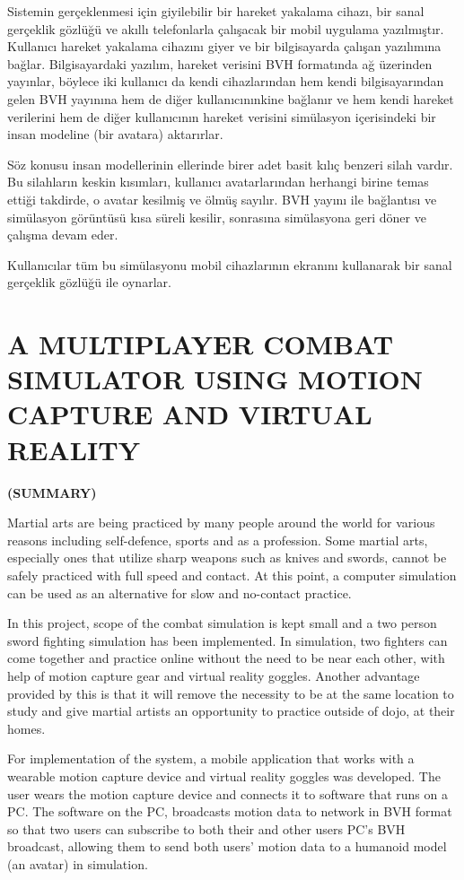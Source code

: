 \documentclass[a4paper, 12pt, titlepage]{article}
\newcommand{\thetitle}{A MULTIPLAYER COMBAT SIMULATOR USING MOTION CAPTURE AND VIRTUAL REALITY}
\begin{document}
Sistemin gerçeklenmesi için giyilebilir bir hareket yakalama cihazı, bir sanal gerçeklik
gözlüğü ve akıllı telefonlarla çalışacak bir mobil uygulama yazılmıştır. Kullanıcı
hareket yakalama cihazını giyer ve bir bilgisayarda çalışan yazılımına bağlar.
Bilgisayardaki yazılım, hareket verisini BVH formatında ağ üzerinden yayınlar, böylece iki kullanıcı da kendi
cihazlarından hem kendi bilgisayarından gelen BVH yayınına hem de diğer kullanıcınınkine
bağlanır ve hem kendi hareket verilerini hem de diğer kullanıcının hareket verisini simülasyon
içerisindeki bir insan modeline (bir avatara) aktarırlar.

Söz konusu insan modellerinin ellerinde birer adet basit kılıç benzeri silah vardır. Bu silahların
keskin kısımları, kullanıcı avatarlarından herhangi birine temas ettiği takdirde, o avatar kesilmiş
ve ölmüş sayılır. BVH yayını ile bağlantısı ve simülasyon görüntüsü kısa süreli kesilir, sonrasına
simülasyona geri döner ve çalışma devam eder.

Kullanıcılar tüm bu simülasyonu mobil cihazlarının ekranını kullanarak bir sanal gerçeklik gözlüğü ile
oynarlar.

\newpage
\section*{\centering\thetitle}
\centerline{\fontsize{16pt}{21.6pt}\sffamily\bfseries (SUMMARY)}
Martial arts are being practiced by many people around the world for various reasons including
self-defence, sports and as a profession. Some martial arts, especially ones that utilize sharp
weapons such as knives and swords, cannot be safely practiced with full speed and contact. At this
point, a computer simulation can be used as an alternative for slow and no-contact practice.

In this project, scope of the combat simulation is kept small and a two person sword fighting
simulation has been implemented. In simulation, two fighters can come together and practice online
without the need to be near each other, with help of motion capture gear and virtual reality
goggles. Another advantage provided by this is that it will remove the necessity to be at the same
location to study and give martial artists an opportunity to practice outside of dojo, at their
homes.

For implementation of the system, a mobile application that works with a wearable motion
capture device and virtual reality goggles was developed. The user wears the
motion capture device and connects it to software that runs on a PC. The software on the PC,
broadcasts motion data to network in BVH format so that two users can subscribe to both their and
other users PC's BVH broadcast, allowing them to send both users’ motion data to a
humanoid model (an avatar) in simulation.
\end{document}
